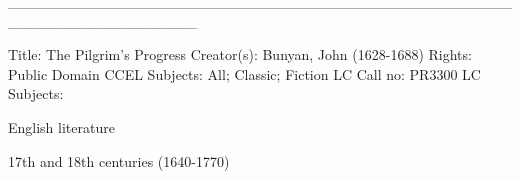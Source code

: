__________________________________________________________________

Title: The Pilgrim's Progress
Creator(s): Bunyan, John (1628-1688)
Rights: Public Domain
CCEL Subjects: All; Classic; Fiction
LC Call no: PR3300
LC Subjects:

English literature

17th and 18th centuries (1640-1770)
